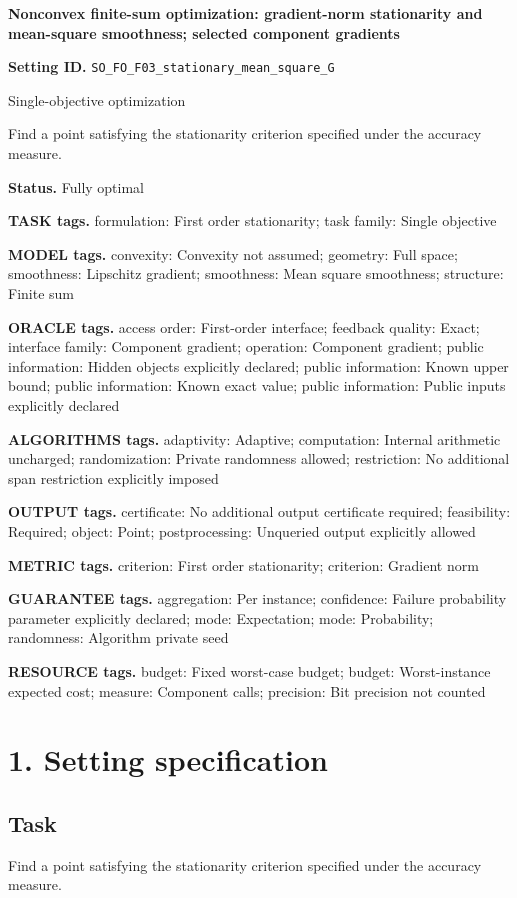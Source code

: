 \documentclass[10pt,a4paper]{article}
\begin{document}
\raggedright

{\LARGE\bfseries\sffamily\color{AtlasNavy} Nonconvex finite-sum optimization: gradient-norm stationarity and mean-square smoothness; selected component gradients\par}\vspace{5pt}
\textbf{Setting ID.} \texttt{SO\_\allowbreak{}FO\_\allowbreak{}F03\_\allowbreak{}stationary\_\allowbreak{}mean\_\allowbreak{}square\_\allowbreak{}G}

Single-objective optimization

Find a point satisfying the stationarity criterion specified under the accuracy measure.

\textbf{Status.} Fully optimal

\textbf{TASK tags.} formulation: First order stationarity; task family: Single objective

\textbf{MODEL tags.} convexity: Convexity not assumed; geometry: Full space; smoothness: Lipschitz gradient; smoothness: Mean square smoothness; structure: Finite sum

\textbf{ORACLE tags.} access order: First-order interface; feedback quality: Exact; interface family: Component gradient; operation: Component gradient; public information: Hidden objects explicitly declared; public information: Known upper bound; public information: Known exact value; public information: Public inputs explicitly declared

\textbf{ALGORITHMS tags.} adaptivity: Adaptive; computation: Internal arithmetic uncharged; randomization: Private randomness allowed; restriction: No additional span restriction explicitly imposed

\textbf{OUTPUT tags.} certificate: No additional output certificate required; feasibility: Required; object: Point; postprocessing: Unqueried output explicitly allowed

\textbf{METRIC tags.} criterion: First order stationarity; criterion: Gradient norm

\textbf{GUARANTEE tags.} aggregation: Per instance; confidence: Failure probability parameter explicitly declared; mode: Expectation; mode: Probability; randomness: Algorithm private seed

\textbf{RESOURCE tags.} budget: Fixed worst-case budget; budget: Worst-instance expected cost; measure: Component calls; precision: Bit precision not counted

\section{1. Setting specification}
\subsection{Task}
Find a point satisfying the stationarity criterion specified under the accuracy measure.
\end{document}
